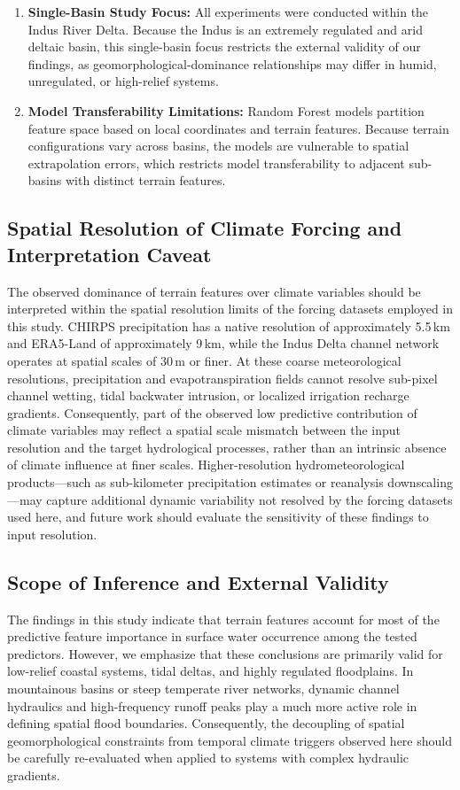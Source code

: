 \begin{enumerate}
    \item \textbf{Single-Basin Study Focus:} All experiments were conducted within the Indus River Delta. Because the Indus is an extremely regulated and arid deltaic basin, this single-basin focus restricts the external validity of our findings, as geomorphological-dominance relationships may differ in humid, unregulated, or high-relief systems.
    \item \textbf{Model Transferability Limitations:} Random Forest models partition feature space based on local coordinates and terrain features. Because terrain configurations vary across basins, the models are vulnerable to spatial extrapolation errors, which restricts model transferability to adjacent sub-basins with distinct terrain features.
\end{enumerate}

\subsection{Spatial Resolution of Climate Forcing and Interpretation Caveat}
The observed dominance of terrain features over climate variables should be interpreted within the spatial resolution limits of the forcing datasets employed in this study. CHIRPS precipitation has a native resolution of approximately 5.5\,km and ERA5-Land of approximately 9\,km, while the Indus Delta channel network operates at spatial scales of 30\,m or finer. At these coarse meteorological resolutions, precipitation and evapotranspiration fields cannot resolve sub-pixel channel wetting, tidal backwater intrusion, or localized irrigation recharge gradients. Consequently, part of the observed low predictive contribution of climate variables may reflect a spatial scale mismatch between the input resolution and the target hydrological processes, rather than an intrinsic absence of climate influence at finer scales. Higher-resolution hydrometeorological products---such as sub-kilometer precipitation estimates or reanalysis downscaling---may capture additional dynamic variability not resolved by the forcing datasets used here, and future work should evaluate the sensitivity of these findings to input resolution.

\subsection{Scope of Inference and External Validity}
The findings in this study indicate that terrain features account for most of the predictive feature importance in surface water occurrence among the tested predictors. However, we emphasize that these conclusions are primarily valid for low-relief coastal systems, tidal deltas, and highly regulated floodplains. In mountainous basins or steep temperate river networks, dynamic channel hydraulics and high-frequency runoff peaks play a much more active role in defining spatial flood boundaries. Consequently, the decoupling of spatial geomorphological constraints from temporal climate triggers observed here should be carefully re-evaluated when applied to systems with complex hydraulic gradients.

